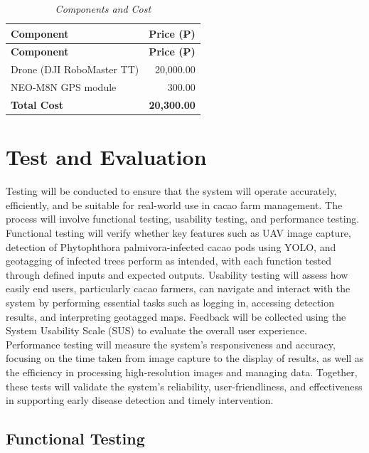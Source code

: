 \begin{longtable}{p{8cm} r}
	\caption{\textit{Components and Cost}} \label{tab:components} \\

	\toprule
	\textbf{Component}        & \textbf{Price (₱)}                \\
	\midrule
	\endfirsthead

	\toprule
	\textbf{Component}        & \textbf{Price (₱)}                \\
	\midrule
	\endhead

	\bottomrule
	\endfoot

	Drone (DJI RoboMaster TT) & 20,000.00                         \\
	NEO-M8N GPS module        & 300.00                            \\
	\midrule
	\textbf{Total Cost}       & \textbf{20,300.00}                \\
\end{longtable}


\section{Test and Evaluation}

Testing will be conducted to ensure that the system will operate accurately, efficiently, and be suitable for real-world use in cacao farm management. The process will involve functional testing, usability testing, and performance testing. Functional testing will verify whether key features such as UAV image capture, detection of Phytophthora palmivora-infected cacao pods using YOLO, and geotagging of infected trees perform as intended, with each function tested through defined inputs and expected outputs. Usability testing will assess how easily end users, particularly cacao farmers, can navigate and interact with the system by performing essential tasks such as logging in, accessing detection results, and interpreting geotagged maps. Feedback will be collected using the System Usability Scale (SUS) to evaluate the overall user experience. Performance testing will measure the system’s responsiveness and accuracy, focusing on the time taken from image capture to the display of results, as well as the efficiency in processing high-resolution images and managing data. Together, these tests will validate the system’s reliability, user-friendliness, and effectiveness in supporting early disease detection and timely intervention.

\subsection{Functional Testing}

